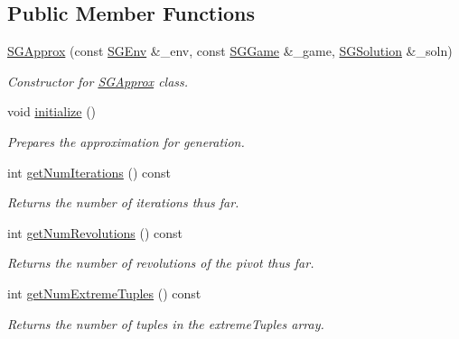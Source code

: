 \subsection*{Public Member Functions}
\begin{DoxyCompactItemize}
\item 
\mbox{\label{classSGApprox_a765c3c57b31d813ced0f7f93f6d4bb11}} 
\hyperlink{classSGApprox_a765c3c57b31d813ced0f7f93f6d4bb11}{S\+G\+Approx} (const \hyperlink{classSGEnv}{S\+G\+Env} \&\+\_\+env, const \hyperlink{classSGGame}{S\+G\+Game} \&\+\_\+game, \hyperlink{classSGSolution}{S\+G\+Solution} \&\+\_\+soln)
\begin{DoxyCompactList}\small\item\em Constructor for \hyperlink{classSGApprox}{S\+G\+Approx} class. \end{DoxyCompactList}\item 
void \hyperlink{classSGApprox_a4bca21d3b688b3ca283c6778c593563a}{initialize} ()
\begin{DoxyCompactList}\small\item\em Prepares the approximation for generation. \end{DoxyCompactList}\item 
\mbox{\label{classSGApprox_a35d7e3b13dd061c3cbb866aecc57581c}} 
int \hyperlink{classSGApprox_a35d7e3b13dd061c3cbb866aecc57581c}{get\+Num\+Iterations} () const
\begin{DoxyCompactList}\small\item\em Returns the number of iterations thus far. \end{DoxyCompactList}\item 
\mbox{\label{classSGApprox_afe20255116c97f7deea72e30fbb262a1}} 
int \hyperlink{classSGApprox_afe20255116c97f7deea72e30fbb262a1}{get\+Num\+Revolutions} () const
\begin{DoxyCompactList}\small\item\em Returns the number of revolutions of the pivot thus far. \end{DoxyCompactList}\item 
\mbox{\label{classSGApprox_aec59b7e590064ceedd45b0faaf3297cc}} 
int \hyperlink{classSGApprox_aec59b7e590064ceedd45b0faaf3297cc}{get\+Num\+Extreme\+Tuples} () const
\begin{DoxyCompactList}\small\item\em Returns the number of tuples in the extreme\+Tuples array. \end{DoxyCompactList}\item 

\end{DoxyCompactItemize}
